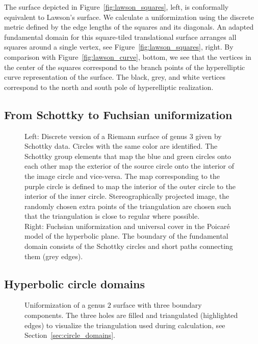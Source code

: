 \documentclass[Thesis]{subfiles}
\begin{document}
The surface depicted in Figure~\ref{fig:lawson_squares}, left, is conformally equivalent to Lawson's surface. We calculate a uniformization using the discrete metric defined by the edge lengths of the squares and its diagonals. An adapted fundamental domain for this square-tiled translational surface arranges all squares around a single vertex, see Figure~\ref{fig:lawson_squares}, right. By comparison with Figure~\ref{fig:lawson_curve}, bottom, we see that the vertices in the center of the squares correspond to the branch points of the hyperelliptic curve representation of the surface. The black, grey, and white vertices correspond to the north and south pole of hyperelliptic realization.


\subsection{From Schottky to Fuchsian uniformization}
\label{sec:schottky}

\begin{figure}
\centering
{}
\caption{
Left: Discrete version of a Riemann surface of genus $3$ given by Schottky data.
Circles with the same color are identified.
The Schottky group elements that map the blue and green circles onto each other map the exterior of the source circle onto the interior of the image circle and vice-versa.
The map corresponding to the purple circle is defined to map the interior of the outer circle to the interior of the inner circle. Stereographically projected image, the randomly chosen extra points of the triangulation are chosen such that the triangulation is close to regular where possible.
\\
Right: Fuchsian uniformization and universal cover in the Poicar\'e model of the hyperbolic plane. The boundary of the fundamental domain consists of  the Schottky circles and short paths connecting them (grey edges).}
\end{figure}

\subsection{Hyperbolic circle domains}
\label{sec:hyperbolic_circle_domain}

\begin{figure}
\centering
{}
\caption{
Uniformization of a genus $2$ surface with three boundary components. 
The three holes are filled and triangulated (highlighted edges) to visualize the triangulation used during calculation, see Section~\ref{sec:circle_domains}.
}
\label{fig:hyperbolic_circle_domain}
\end{figure}
\end{document}
